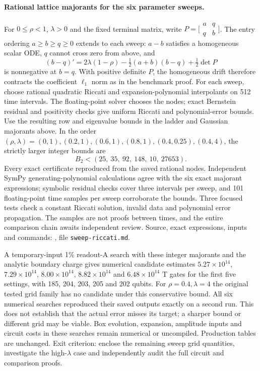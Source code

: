 \documentclass[11pt,a4paper]{article}
\begin{document}
\paragraph{Rational lattice majorants for the six parameter sweeps.}
For $0\le\rho<1$, $\lambda>0$ and the fixed terminal matrix, write
$P=\bigl[\begin{smallmatrix}a&q\\q&b\end{smallmatrix}\bigr]$. The entry
ordering $a\ge b\ge q\ge0$ extends to each sweep: $a-b$ satisfies a
homogeneous scalar ODE, $q$ cannot cross zero from above, and
\[
 (b-q)'=2\lambda(1-\rho)-\tfrac12(a+b)(b-q)+\tfrac12\det P
\]
is nonnegative at $b=q$. With positive definite $P$, the homogeneous drift
therefore contracts the coefficient $\ell_1$ norm as in the benchmark proof.
For each sweep, choose rational quadratic Riccati and expansion-polynomial
interpolants on 512 time intervals. The floating-point solver chooses the
nodes; exact Bernstein residual and positivity checks give uniform Riccati
and polynomial-error bounds. Use the resulting row and eigenvalue bounds in
the ladder and Gaussian majorants above. In the order
$(\rho,\lambda)=(0,1),(0.2,1),(0.6,1),(0.8,1),(0.4,0.25),(0.4,4)$,
the strictly larger integer bounds are
\[
 B_2<(25,\ 35,\ 92,\ 148,\ 10,\ 27653).
\]
Every exact certificate reproduced from the saved rational nodes. Independent
SymPy generating-polynomial calculations agree with the six exact majorant
expressions; symbolic residual checks cover three intervals per sweep, and
101 floating-point time samples per sweep corroborate the bounds. Three
focused tests check a constant Riccati solution, invalid data and polynomial
error propagation. The samples are not proofs between times, and the entire
comparison chain awaits independent review. Source, exact expressions,
inputs and commands: , file
\texttt{sweep-riccati.md}.

A temporary-input 1\% readout-A search with these integer majorants and the
analytic boundary charge gives numerical candidate estimates
$5.27\times10^{14}$, $7.29\times10^{14}$, $8.00\times10^{14}$,
$8.82\times10^{14}$ and $6.48\times10^{14}$ T gates for the first five
settings, with 185, 204, 203, 205 and 202 qubits. For $\rho=0.4,\lambda=4$
the original tested grid family has no candidate under this conservative
bound. All six numerical searches reproduced their saved outputs exactly on a
second run. This does not establish that the actual error misses its target; a
sharper bound or different grid may be viable. Box evolution, expansion,
amplitude inputs and circuit costs in these searches remain numerical or
uncompiled. Production tables are unchanged. Exit criterion: enclose the
remaining sweep grid quantities, investigate the high-$\lambda$ case and
independently audit the full circuit and comparison proofs.
\end{document}
